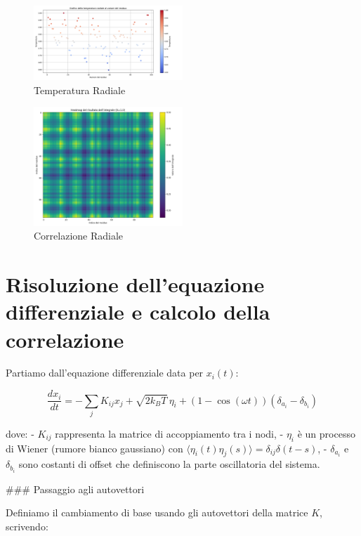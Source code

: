 \documentclass[Lau,binding=0.6cm,oneside,noexaminfo]{sapthesis}
\begin{document}
\begin{figure}[H]
    \centering
    \includegraphics[width=0.5\textwidth]{"images/2m10_2_temperature_sferic.png"}
    \caption{Temperatura Radiale}
\end{figure}
\begin{figure}[H]
    \centering
    \includegraphics[width=0.5\textwidth]{"images/2m10_2_temperature_correlation_sferic.png"}
    \caption{Correlazione Radiale}
\end{figure}






\section*{Risoluzione dell'equazione differenziale e calcolo della correlazione}

Partiamo dall'equazione differenziale data per \( x_i(t) \):

\[
\frac{dx_i}{dt} = -\sum_j K_{ij} x_j + \sqrt{2 k_B T} \, \eta_i + \left(1 - \cos(\omega t)\right)(\delta_{a_i} - \delta_{b_i})
\]

dove:
- \( K_{ij} \) rappresenta la matrice di accoppiamento tra i nodi,
- \( \eta_i \) è un processo di Wiener (rumore bianco gaussiano) con \(\langle \eta_i(t) \eta_j(s) \rangle = \delta_{ij} \delta(t - s)\),
- \( \delta_{a_i} \) e \( \delta_{b_i} \) sono costanti di offset che definiscono la parte oscillatoria del sistema.

### Passaggio agli autovettori

Definiamo il cambiamento di base usando gli autovettori della matrice \( K \), scrivendo:
\end{document}

